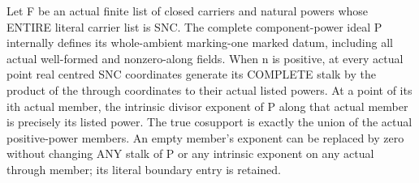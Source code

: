 \begin{lemma}
\label{hir:nc-ordered-tail-whole-indexed-product}
\leanok
Let F be an actual finite list of closed carriers and natural powers whose
ENTIRE literal carrier list is SNC. The complete component-power ideal P
internally defines its whole-ambient marking-one marked datum, including all
actual well-formed and nonzero-along fields. When n is positive, at every actual point real
centred SNC coordinates generate its COMPLETE stalk by the product of the
through coordinates to their actual listed powers. At a point of its ith
actual member, the intrinsic divisor exponent of P along that actual member
is precisely its listed power. The true cosupport is exactly the union of
the actual positive-power members. An empty member's exponent can be replaced
by zero without changing ANY stalk of P or any intrinsic exponent on any
actual through member; its literal boundary entry is retained.
\end{lemma}

